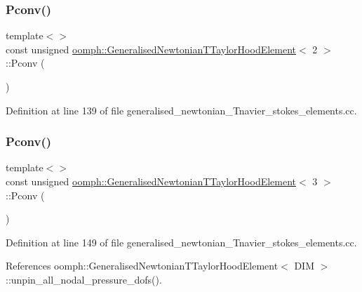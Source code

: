 \subsubsection{\texorpdfstring{Pconv()}{Pconv()}\hspace{0.1cm}{\footnotesize\ttfamily [1/2]}}
{\footnotesize\ttfamily template$<$$>$ \\
const unsigned \hyperlink{classoomph_1_1GeneralisedNewtonianTTaylorHoodElement}{oomph\+::\+Generalised\+Newtonian\+T\+Taylor\+Hood\+Element}$<$ 2 $>$\+::Pconv (\begin{DoxyParamCaption}{ }\end{DoxyParamCaption})\hspace{0.3cm}{\ttfamily [protected]}}



Definition at line 139 of file generalised\+\_\+newtonian\+\_\+\+Tnavier\+\_\+stokes\+\_\+elements.\+cc.

\mbox{\label{classoomph_1_1GeneralisedNewtonianTTaylorHoodElement_a0458e47c21509174ad9647472e718f6b}} 
\subsubsection{\texorpdfstring{Pconv()}{Pconv()}\hspace{0.1cm}{\footnotesize\ttfamily [2/2]}}
{\footnotesize\ttfamily template$<$$>$ \\
const unsigned \hyperlink{classoomph_1_1GeneralisedNewtonianTTaylorHoodElement}{oomph\+::\+Generalised\+Newtonian\+T\+Taylor\+Hood\+Element}$<$ 3 $>$\+::Pconv (\begin{DoxyParamCaption}{ }\end{DoxyParamCaption})\hspace{0.3cm}{\ttfamily [protected]}}



Definition at line 149 of file generalised\+\_\+newtonian\+\_\+\+Tnavier\+\_\+stokes\+\_\+elements.\+cc.



References oomph\+::\+Generalised\+Newtonian\+T\+Taylor\+Hood\+Element$<$ D\+I\+M $>$\+::unpin\+\_\+all\+\_\+nodal\+\_\+pressure\+\_\+dofs().

